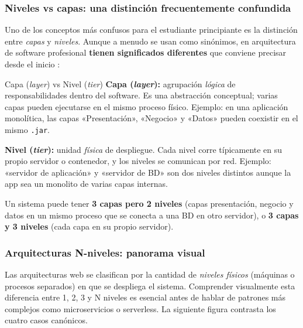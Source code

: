 \subsubsection{Niveles vs capas: una distinción frecuentemente confundida}

Uno de los conceptos más confusos para el estudiante principiante es
la distinción entre \emph{capas} y \emph{niveles}. Aunque a menudo se
usan como sinónimos, en arquitectura de software profesional
\textbf{tienen significados diferentes} que conviene precisar desde el
inicio \cite{fowler2002patterns,richards2020fundamentals}:

\begin{cajadefinicion}{Capa (\emph{layer}) vs Nivel (\emph{tier})}
\textbf{Capa (\emph{layer}):} agrupación \emph{lógica} de
responsabilidades dentro del software. Es una abstracción
conceptual; varias capas pueden ejecutarse en el mismo proceso físico.
Ejemplo: en una aplicación monolítica, las capas «Presentación»,
«Negocio» y «Datos» pueden coexistir en el mismo \texttt{.jar}.

\textbf{Nivel (\emph{tier}):} unidad \emph{física} de despliegue. Cada
nivel corre típicamente en su propio servidor o contenedor, y los
niveles se comunican por red. Ejemplo: «servidor de aplicación» y
«servidor de BD» son dos niveles distintos aunque la app sea un
monolito de varias capas internas.

Un sistema puede tener \textbf{3 capas pero 2 niveles} (capas
presentación, negocio y datos en un mismo proceso que se conecta a una
BD en otro servidor), o \textbf{3 capas y 3 niveles} (cada capa en su
propio servidor).
\end{cajadefinicion}

\subsubsection{Arquitecturas N-niveles: panorama visual}

Las arquitecturas web se clasifican por la cantidad de
\emph{niveles físicos} (máquinas o procesos separados) en que se
despliega el sistema. Comprender visualmente esta diferencia entre
1, 2, 3 y N niveles es esencial antes de hablar de patrones más
complejos como microservicios o serverless. La siguiente figura
contrasta los cuatro casos canónicos.


